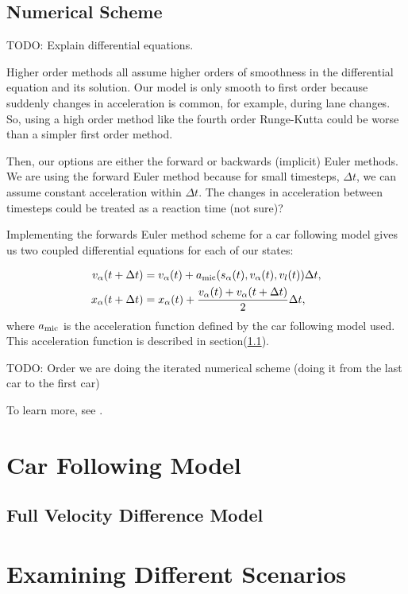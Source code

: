 \documentclass[12pt]{article}
\begin{document}
    \subsection{Numerical Scheme}
        TODO: Explain differential equations.

    Higher order methods all assume higher orders of smoothness in the differential equation and its solution.
    Our model is only smooth to first order because suddenly changes in acceleration is common, for example, during lane changes. 
    So, using a high order method like the fourth order Runge-Kutta could be worse than a simpler first order method.

    Then, our options are either the forward or backwards (implicit) Euler methods. 
    We are using the forward Euler method because for small timesteps, $\Delta t$, we can assume constant acceleration within $\Delta t$. 
    The changes in acceleration between timesteps could be treated as a reaction time (not sure)? 

    Implementing the forwards Euler method scheme for a car following model gives us two coupled differential equations for each of our states:

    \begin{align}
        v_\alpha(t+\Delta t) &= v_\alpha(t) +a_{\rm mic}(s_\alpha(t), v_\alpha (t), v_l (t))\Delta t,\\
        x_\alpha(t + \Delta t) &= x_\alpha(t) + \frac{v_\alpha (t) + v_\alpha (t+\Delta t)}{2}\Delta t,
    \end{align}
    where $a_{\rm mic}$ is the acceleration function defined by the car following model used. This acceleration function is described in  section(\ref{ch3.1}).

    TODO:  Order we are doing the iterated numerical scheme (doing it from the last car to the first car)
    
    To learn more, see \cite{numerics}.
    \section{Car Following Model}
    \subsection{Full Velocity Difference Model}\label{ch3.1}
    \section{Examining Different Scenarios}
\end{document}
